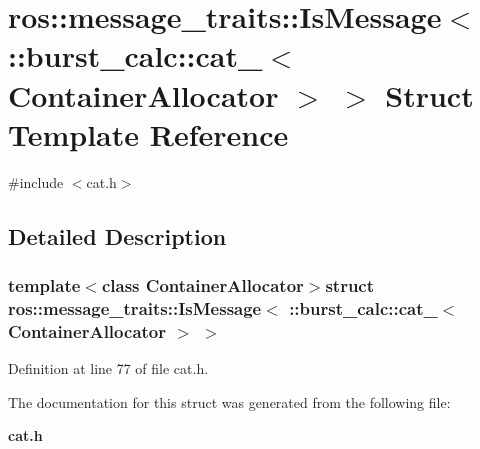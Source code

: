 \section{ros\-:\-:message\-\_\-traits\-:\-:\-Is\-Message$<$ \-:\-:burst\-\_\-calc\-:\-:cat\-\_\-$<$ \-Container\-Allocator $>$ $>$ \-Struct \-Template \-Reference}
\label{structros_1_1message__traits_1_1IsMessage_3_01_1_1burst__calc_1_1cat___3_01ContainerAllocator_01_4_01_4}


{\ttfamily \#include $<$cat.\-h$>$}



\subsection{\-Detailed \-Description}
\subsubsection*{template$<$class Container\-Allocator$>$struct ros\-::message\-\_\-traits\-::\-Is\-Message$<$ \-::burst\-\_\-calc\-::cat\-\_\-$<$ Container\-Allocator $>$ $>$}



\-Definition at line 77 of file cat.\-h.



\-The documentation for this struct was generated from the following file\-:\begin{DoxyCompactItemize}
\item 
{\bf cat.\-h}\end{DoxyCompactItemize}
